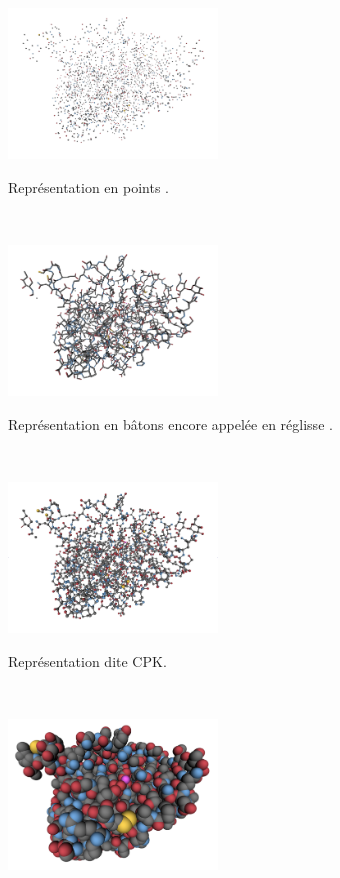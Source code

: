     \begin{figure}[htb]
        \begin{subfigure}[t]{\subImgW}
            \centering
            {\includegraphics[height=4cm]{./figures/ch1/4awn_points}}
            \caption{Représentation en \og points \fg{}.}
            \label{fig:4awn_points}
        \end{subfigure}
        ~
        \begin{subfigure}[t]{\subImgW}
            \centering
            {\includegraphics[height=4cm]{./figures/ch1/4awn_licorice}}
            \caption{Représentation en \og bâtons \fg{} encore appelée en \og réglisse \fg{}.}
            \label{fig:4awn_licorice}
        \end{subfigure}
        ~
        \begin{subfigure}[t]{\subImgW}
            \centering
            {\includegraphics[height=4cm]{./figures/ch1/4awn_CPK}}
            \caption{Représentation dite CPK.}
            \label{fig:4awn_CPK}
        \end{subfigure}
        ~
        \begin{subfigure}[t]{\subImgW}
            \centering
            {\includegraphics[height=4cm]{./figures/ch1/4awn_vdW}}

\end{subfigure}
\end{figure}
